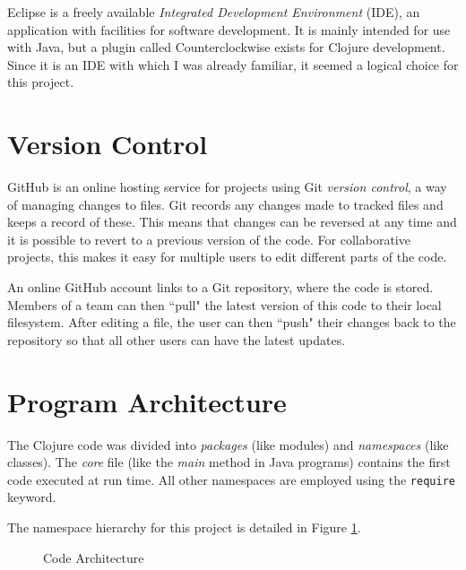 Eclipse is a freely available \textit{Integrated Development Environment} (IDE), an application with facilities for software development. It is mainly intended for use with Java, but a plugin called Counterclockwise exists for Clojure development. Since it is an IDE with which I was already familiar, it seemed a logical choice for this project. 

\section{Version Control}

GitHub is an online hosting service for projects using Git \textit{version control}, a way of managing changes to files. Git records any changes made to tracked files and keeps a record of these. This means that changes can be reversed at any time and it is possible to revert to a previous version of the code. For collaborative projects, this makes it easy for multiple users to edit different parts of the code. 

An online GitHub account links to a Git repository, where the code is stored. Members of a team can then ``pull" the latest version of this code to their local filesystem. After editing a file, the user can then ``push" their changes back to the repository so that all other users can have the latest updates. 

\section{Program Architecture}

The Clojure code was divided into \textit{packages} (like modules) and \textit{namespaces} (like classes). The \textit{core} file (like the \textit{main} method in Java programs) contains the first code executed at run time. All other namespaces are employed using the \lstinline!require! keyword. 

The namespace hierarchy for this project is detailed in Figure \ref{fig:namespaceHierarchy}.

\begin{figure}[h]
\centering
{}
\caption{Code Architecture}
\label{fig:namespaceHierarchy}
\end{figure}

